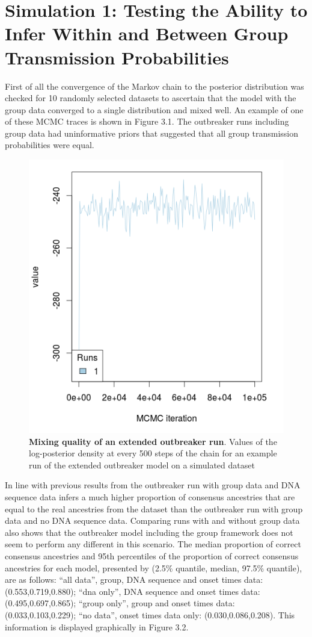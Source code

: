 \documentclass[11pt,a4paper]{report}
\begin{document}
\section{Simulation 1: Testing the Ability to Infer Within and Between Group Transmission Probabilities}
First of all the convergence of the Markov chain to the posterior distribution was checked for 10 randomly selected datasets to ascertain that the model with the group data converged to a single distribution and mixed well. An example of one of these MCMC traces is shown in Figure 3.1. The outbreaker runs including group data had uninformative priors that suggested that all group transmission probabilities were equal. 
\begin{figure}
\centering
\includegraphics[scale=0.6]{trace.png}
\newline
\caption{{\bf Mixing quality of an extended outbreaker run}. Values of the log-posterior density at every 500 steps of the chain for an example run of the extended outbreaker model on a simulated dataset}
\end{figure}
In line with previous results from \citet{outbrkr} the outbreaker run with group data and DNA sequence data infers a much higher proportion of consensus ancestries that are equal to the real ancestries from the dataset than the outbreaker run with group data and no DNA sequence data. Comparing runs with and without group data also shows that the outbreaker model including the group framework does not seem to perform any different in this scenario. The median proportion of correct consensus ancestries and 95th percentiles of the proportion of correct consensus ancestries for each model, presented by (2.5\% quantile, median, 97.5\% quantile), are as follows: ``all data'', group, DNA sequence and onset times data: (0.553,0.719,0.880); ``dna only'', DNA sequence and onset times data: (0.495,0.697,0.865); ``group only'', group and onset times data: (0.033,0.103,0.229); ``no data'', onset times data only: (0.030,0.086,0.208). This information is displayed graphically in Figure 3.2.
\end{document}
